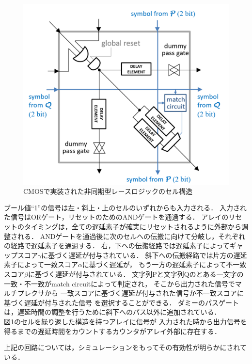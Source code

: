 \begin{itemize}
\begin{figure}[t!]
\begin{center}
\includegraphics[keepaspectratio,scale=0.3]{fig/2/CMOSasync.png}
\caption{CMOSで実装された非同期型レースロジックのセル構造\cite{madhavan20174}}
\label{fig:CMOSasync}
\end{center}
\end{figure}
ブール値“1”の信号は左・斜上・上のセルのいずれからも入力される．
入力された信号はORゲート，リセットのためのANDゲートを通過する．
アレイのリセットのタイミングは，全ての遅延素子が確実にリセットされるように外部から調整される．
ANDゲートを通過後に次のセルへの伝搬に向けて分岐し，それぞれの経路で遅延素子を通過する．
右，下への伝搬経路では遅延素子によってギャップスコア$\gamma$に基づく遅延が付与されている．
斜下への伝搬経路では片方の遅延素子によって一致スコア$\alpha$に基づく遅延が，
もう一方の遅延素子によって不一致スコア$\beta$に基づく遅延が付与されている．
文字列Pと文字列Qのとある一文字の一致・不一致がmatch circuitによって判定され，
そこから出力された信号でマルチプレクサから
一致スコアに基づく遅延が付与された信号か不一致スコアに基づく遅延が付与された信号
を選択することができる．
ダミーのパスゲートは，遅延時間の調整を行うために斜下へのパス以外に追加されている．\\
図\ref{fig:CMOSasync}のセルを繰り返した構造を持つアレイに信号が
入力された時から出力信号を得るまでの遅延時間をカウントするカウンタがアレイ外部に存在する．
\end{itemize}
上記の回路については，シミュレーションをもってその有効性が明らかにされている．

